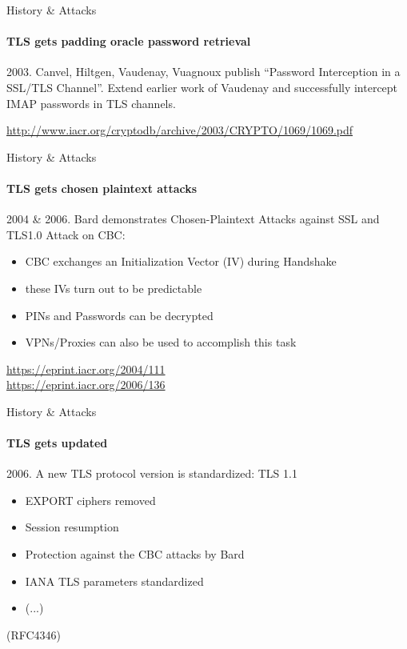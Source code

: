 \documentclass[hyperref={draft}]{beamer}
\begin{document}
\begin{frame}{History \& Attacks}
  \framesubtitle{TLS gets padding oracle password retrieval}
  2003. Canvel, Hiltgen, Vaudenay, Vuagnoux publish ``Password Interception in a SSL/TLS Channel''.
  \newline
  \newline
  Extend earlier work of Vaudenay and successfully intercept IMAP passwords in TLS channels.

  \vspace{95px}

  \tiny\url{http://www.iacr.org/cryptodb/archive/2003/CRYPTO/1069/1069.pdf}
\end{frame}

\begin{frame}{History \& Attacks}
  \framesubtitle{TLS gets chosen plaintext attacks}
  2004 \& 2006. Bard demonstrates Chosen-Plaintext Attacks against SSL and TLS1.0
  \newline
  \newline
  Attack on CBC:
  \begin{itemize}
    \item CBC exchanges an Initialization Vector (IV) during Handshake
    \item these IVs turn out to be predictable
    \item PINs and Passwords can be decrypted
    \item VPNs/Proxies can also be used to accomplish this task
  \end{itemize}
  
  \vspace{50px}

  \tiny
  \url{https://eprint.iacr.org/2004/111}\\
  \url{https://eprint.iacr.org/2006/136}
\end{frame}

\begin{frame}{History \& Attacks}
  \framesubtitle{TLS gets updated}
  2006. A new TLS protocol version is standardized: TLS 1.1
  \begin{itemize}
    \item EXPORT ciphers removed
    \item Session resumption 
    \item Protection against the CBC attacks by Bard
    \item IANA TLS parameters standardized
    \item (...)
  \end{itemize}
   (RFC4346)
\end{frame}
\end{document}
